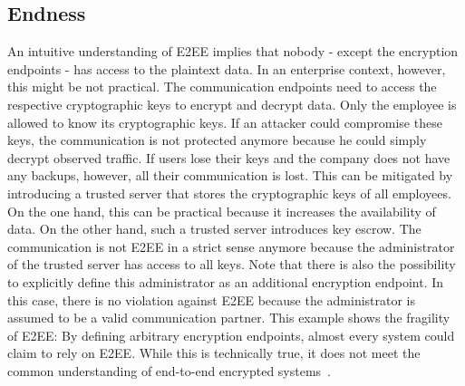 \documentclass[../main.tex]{subfiles}
\begin{document}
\subsection{Endness}

An intuitive understanding of E2EE implies that nobody - except the encryption endpoints - has access to the plaintext data.
In an enterprise context, however, this might be not practical.
The communication endpoints need to access the respective cryptographic keys to encrypt and decrypt data.
Only the employee is allowed to know its cryptographic keys.
If an attacker could compromise these keys, the communication is not protected anymore because he could simply decrypt observed traffic.
If users lose their keys and the company does not have any backups, however, all their communication is lost.
This can be mitigated by introducing a trusted server that stores the cryptographic keys of all employees.
On the one hand, this can be practical because it increases the availability of data. 
On the other hand, such a trusted server introduces key escrow.
The communication is not E2EE in a strict sense anymore because the administrator of the trusted server has access to all keys.
Note that there is also the possibility to explicitly define this administrator as an additional encryption endpoint.
In this case, there is no violation against E2EE because the administrator is assumed to be a valid communication partner.
This example shows the fragility of E2EE:
By defining arbitrary encryption endpoints, almost every system could claim to rely on E2EE.
While this is technically true, it does not meet the common understanding of end-to-end encrypted systems~\cite{Hale2022,Nabeel2017,Mallory2022}.
\end{document}
